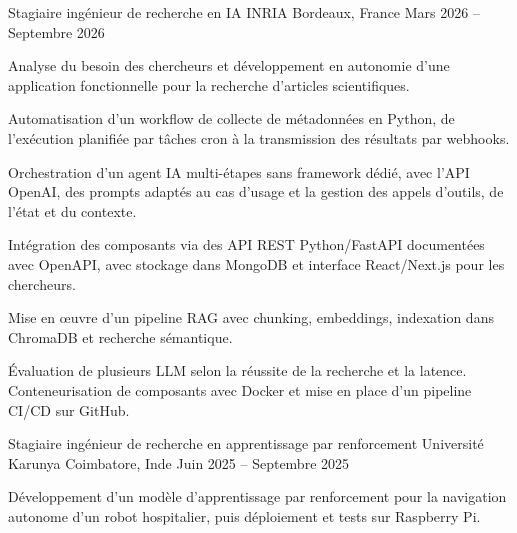 
\begin{cventries}
  \cventry
    {Stagiaire ingénieur de recherche en IA}
    {INRIA}
    {Bordeaux, France}
    {Mars 2026 -- Septembre 2026}
    {
      \begin{cvitems}
        \item {Analyse du besoin des chercheurs et développement en autonomie d’une application fonctionnelle pour la recherche d’articles scientifiques.}
        \item {Automatisation d’un workflow de collecte de métadonnées en Python, de l’exécution planifiée par tâches cron à la transmission des résultats par webhooks.}
        \item {Orchestration d’un agent IA multi-étapes sans framework dédié, avec l’API OpenAI, des prompts adaptés au cas d’usage et la gestion des appels d’outils, de l’état et du contexte.}
        \item {Intégration des composants via des API REST Python/FastAPI documentées avec OpenAPI, avec stockage dans MongoDB et interface React/Next.js pour les chercheurs.}
        \item {Mise en œuvre d’un pipeline RAG avec chunking, embeddings, indexation dans ChromaDB et recherche sémantique.}
        \item {Évaluation de plusieurs LLM selon la réussite de la recherche et la latence. Conteneurisation de composants avec Docker et mise en place d’un pipeline CI/CD sur GitHub.}
      \end{cvitems}
    }

  \cventry
    {Stagiaire ingénieur de recherche en apprentissage par renforcement}
    {Université Karunya}
    {Coimbatore, Inde}
    {Juin 2025 -- Septembre 2025}
    {
      \begin{cvitems}
        \item {Développement d’un modèle d’apprentissage par renforcement pour la navigation autonome d’un robot hospitalier, puis déploiement et tests sur Raspberry Pi.}
      \end{cvitems}
    }
\end{cventries}

